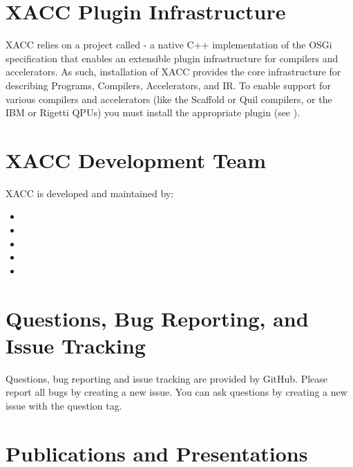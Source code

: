 \documentclass[letterpaper,10pt,english]{sphinxmanual}
\begin{document}
\section{XACC Plugin Infrastructure}
\label{\detokenize{overview:xacc-plugin-infrastructure}}
XACC relies on a project called  - a native C++ implementation of the OSGi specification that enables an extensible plugin infrastructure for compilers and accelerators. As such, installation of XACC provides the core infrastructure for describing Programs, Compilers, Accelerators, and IR. To enable support for various compilers and accelerators (like the Scaffold or Quil compilers, or the IBM or Rigetti QPUs) you must install the appropriate plugin (see ).


\section{XACC Development Team}
\label{\detokenize{overview:xacc-development-team}}
XACC is developed and maintained by:
\begin{itemize}
\item {} 

\item {} 

\item {} 

\item {} 

\item {} 

\end{itemize}


\section{Questions, Bug Reporting, and Issue Tracking}
\label{\detokenize{overview:questions-bug-reporting-and-issue-tracking}}
Questions, bug reporting and issue tracking are provided by GitHub. Please
report all bugs by creating a new issue. You can ask questions by creating a
new issue with the question tag.


\section{Publications and Presentations}
\label{\detokenize{overview:publications-and-presentations}}
\end{document}
